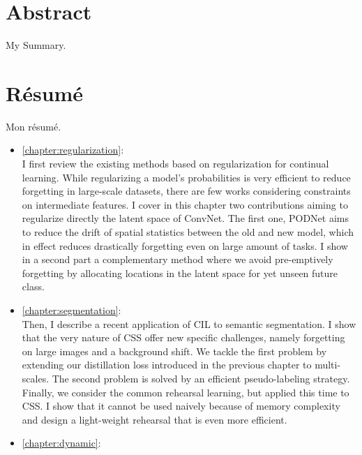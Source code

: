 \cleardoublepage
\setcounter{page}{1}

\chapter{Abstract}

My Summary.
\cleardoublepage


\chapter{R\'esum\'e}


Mon résumé.

\begin{itemize}
    \item \autoref{chapter:regularization}: \\
          I first review the existing methods based on regularization for continual learning. While
          regularizing a model's probabilities is very efficient to reduce forgetting in large-scale
          datasets, there are few works considering constraints on intermediate features. I cover in this
          chapter two contributions aiming to regularize directly the latent space of \acs{ConvNet}. The
          first one, \acf{PODNet} aims to reduce the drift of spatial statistics between the old and new
          model, which in effect reduces drastically forgetting even on large amount of tasks. I show in a
          second part a complementary method where we avoid pre-emptively forgetting by allocating
          locations in the latent space for yet unseen future class.
    \item \autoref{chapter:segmentation}: \\
          Then, I describe a recent application of \acf{CIL} to semantic segmentation. I show that
          the very nature of \acf{CSS} offer new specific challenges, namely forgetting on large
          images and a background shift. We tackle the first problem by extending our distillation
          loss introduced in the previous chapter to multi-scales. The second problem is solved by
          an efficient pseudo-labeling strategy. Finally, we consider the common rehearsal learning,
          but applied this time to \ac{CSS}. I show that it cannot be used naively because of memory
          complexity and design a light-weight rehearsal that is even more efficient.
    \item \autoref{chapter:dynamic}: \\

\end{itemize}
